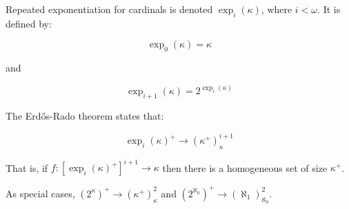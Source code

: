 \documentclass[12pt]{article}
\begin{document}
Repeated exponentiation for cardinals is denoted $\operatorname{exp}_i(\kappa)$, where $i<\omega$.  It is defined by:

$$\operatorname{exp}_0(\kappa)=\kappa$$

and

$$\operatorname{exp}_{i+1}(\kappa)=2^{\operatorname{exp}_{i}(\kappa)}$$

The Erd\H{o}s-Rado theorem states that:

$$\operatorname{exp}_i(\kappa)^+\rightarrow(\kappa^+)^{i+1}_\kappa$$

That is, if $f:[\operatorname{exp}_i(\kappa)^+]^{i+1}\rightarrow\kappa$ then there is a homogeneous set of size $\kappa^+$.

As special cases, $(2^\kappa)^+\rightarrow(\kappa^+)^2_\kappa$ and $(2^{\aleph_0})^+\rightarrow(\aleph_1)^2_{\aleph_0}$.
\end{document}
